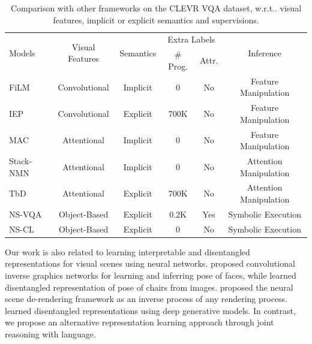 \documentclass{article} %
\makeatletter
\DeclareRobustCommand\onedot{\futurelet\@let@token\@onedot}
\def\@onedot{\ifx\@let@token.\else.\null\fi\xspace}
\def\wrt{w.r.t\onedot} \def\dof{d.o.f\onedot}
\newcommand{\model}{NS-CL\xspace}
\makeatother
\begin{document}
%
\begin{table}[t]
    \centering\small
    \setlength{\tabcolsep}{4pt}
    \begin{tabular}{lccccc}
        \toprule
        \multirow{2}{*}{Models} & \multirow{2}{*}{Visual Features} & \multirow{2}{*}{Semantics} & \multicolumn{2}{c}{Extra Labels} & \multirow{2}{*}{Inference} \\ 
        \cmidrule{4-5}
        & & & \# Prog. & Attr. & \\
        \midrule
        FiLM \citep{Perez2017Film} & Convolutional & Implicit & 0 & No & Feature Manipulation\\
        IEP \citep{Johnson2017Inferring} & Convolutional & Explicit & 700K & No &  Feature Manipulation\\
        \midrule
        MAC \citep{Hudson2018Compositional} & Attentional & Implicit & 0 & No & Feature Manipulation\\
        Stack-NMN \citep{Hu2018Explainable} & Attentional & Implicit & 0 & No &  Attention Manipulation\\
        TbD \citep{Mascharka2018Transparency} & Attentional & Explicit & 700K & No &  Attention Manipulation\\
        \midrule
        NS-VQA \citep{kexin} & Object-Based & Explicit & 0.2K & Yes & Symbolic Execution\\ 
        \model & Object-Based & Explicit & 0 & No & Symbolic Execution \\
        \bottomrule
    \end{tabular}
    \caption{Comparison with other frameworks on the CLEVR VQA dataset, \wrt visual features, implicit or explicit semantics and supervisions.}
    \label{tab:related-vqa}
\end{table} 
Our work is also related to learning interpretable and disentangled representations for visual scenes using neural networks. \citet{kulkarni2015deep} proposed convolutional inverse graphics networks for learning and inferring pose of faces, while \citet{Yang2015Weakly} learned disentangled representation of pose of chairs from images. \citet{Wu2017Neural} proposed the neural scene de-rendering framework as an inverse process of any rendering process. \citet{Siddharth2017Learning,Higgins2018SCAN} learned disentangled representations using deep generative models. In contrast, we propose an alternative representation learning approach through joint reasoning with language.

%
\end{document}
